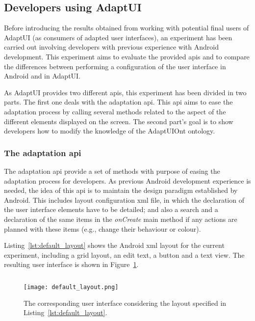 \subsection{Developers using AdaptUI}
\label{sec:developers}

Before introducing the results obtained from working with potential final users
of AdaptUI (as consumers of adapted user interfaces), an experiment has been
carried out involving developers with previous experience with Android development.
This experiment aims to evaluate the provided \acp{api} and to compare the 
differences between performing a configuration of the user interface in Android
and in AdaptUI. 

As AdaptUI provides two different \acp{api}, this experiment has been divided
in two parts. The first one deals with the adaptation \ac{api}. This \ac{api}
aims to ease the adaptation process by calling several methods related to the
aspect of the different elements displayed on the screen. The second part's goal
is to show developers how to modify the knowledge of the AdaptUIOnt ontology.

\subsubsection{The adaptation \ac{api}}
\label{sec:adaptation_api}

The adaptation \ac{api} provide a set of methods with purpose of easing the 
adaptation process for developers. As previous Android development experience
is needed, the idea of this \ac{api} is to maintain the design paradigm established
by Android. This includes layout configuration \ac{xml} file, in which the 
declaration of the user interface elements have to be detailed; and also a
search and a declaration of the same items in the \textit{onCreate} main method
if any actions are planned with these items (e.g., change their behaviour or
colour).

Listing~\ref{lst:default_layout} shows the Android \ac{xml} layout for the current
experiment, including a grid layout, an edit text, a button and a text view. The
resulting user interface is shown in Figure~\ref{fig:default_layout}.

\inputminted[linenos=true, fontsize=\footnotesize, frame=lines]{xml}{5_experiments_and_results/default_layout.xml}

\begin{figure}
\centering
\texttt{[image: default\_layout.png]}
\caption{The corresponding user interface considering the layout specified in
Listing~\ref{lst:default_layout}.}
\label{fig:default_layout}
\end{figure}

